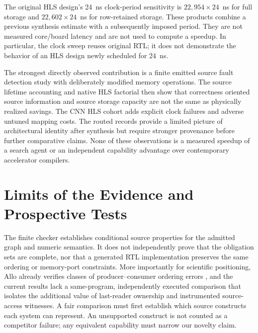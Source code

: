 \documentclass{article}
\begin{document}
The original HLS design's 24~ns clock-period sensitivity is $22{,}954\times24$~ns for full storage and $22{,}602\times24$~ns for row-retained storage. These products combine a previous synthesis estimate with a subsequently imposed period. They are not measured core/board latency and are not used to compute a speedup. In particular, the clock sweep reuses original RTL; it does not demonstrate the behavior of an HLS design newly scheduled for 24~ns.


The strongest directly observed contribution is a finite emitted source fault detection study with deliberately modified memory operations. The source lifetime accounting and native HLS factorial then show that correctness oriented source information and source storage capacity are not the same as physically realized savings. The CNN HLS cohort adds explicit clock failures and adverse untuned mapping costs. The routed records provide a limited picture of architectural identity after synthesis but require stronger provenance before further comparative claims. None of these observations is a measured speedup of a search agent or an independent capability advantage over contemporary accelerator compilers.


\section{Limits of the Evidence and Prospective Tests}
\label{sec:prospective}
The finite checker establishes conditional source properties for the admitted graph and numeric semantics. It does not independently prove that the obligation sets are complete, nor that a generated RTL implementation preserves the same ordering or memory-port constraints. More importantly for scientific positioning, Allo already verifies classes of producer--consumer ordering errors \cite{allo2024}, and the current results lack a same-program, independently executed comparison that isolates the additional value of last-reader ownership and instrumented source-access witnesses. A fair comparison must first establish which source constructs each system can represent. An unsupported construct is not counted as a competitor failure; any equivalent capability must narrow our novelty claim.
\end{document}
